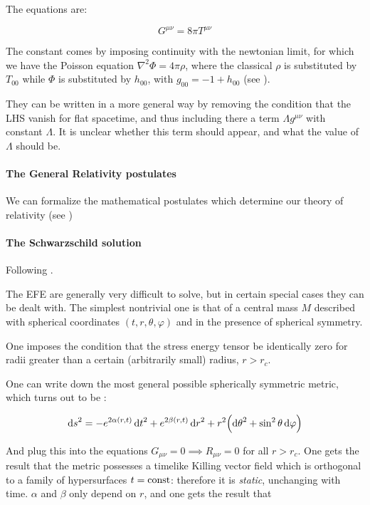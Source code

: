 \documentclass[main.tex]{subfiles}
\begin{document}
The equations are:

\begin{equation}
  G^{\mu\nu} = 8 \pi T^{\mu\nu}
\end{equation}

The constant comes by imposing continuity with the newtonian limit, for which we have the Poisson equation \(\nabla^2 \Phi = 4 \pi \rho\), where the classical \(\rho\) is substituted by \(T_{00}\) while \(\Phi\) is substituted by \(h_{00}\), with \(g_{00} = - 1 + h_{00}\) (see \cite[eq. 4.46]{Carroll:1997ar}).

They can be written in a more general way by removing the condition that the LHS vanish for flat spacetime, and thus including there a term \(\Lambda g^{\mu\nu}\) with constant \(\Lambda\).
It is unclear whether this term should appear, and what the value of \(\Lambda\) should be.

\paragraph{The General Relativity postulates}

We can formalize the mathematical postulates which determine our theory of relativity (see \cite[section 3.2]{})

\paragraph{The Schwarzschild solution}

Following \cite[section 7]{Carroll:1997ar}.

The EFE are generally very difficult to solve, but in certain special cases they can be dealt with. The simplest nontrivial one is that of a central mass \(M\) described with spherical coordinates \((t, r, \theta, \varphi)\) and in the presence of spherical symmetry.

One imposes the condition that the stress energy tensor be identically zero for radii greater than a certain (arbitrarily small) radius, \(r > r_c\).

One can write down the most general possible spherically symmetric metric, which turns out to be \cite[eq. 7.13]{Carroll:1997ar}:

\begin{equation}
  \dd{s} ^2 = -e^{2 \alpha(r, t)} \dd{t}^2 + e^{2 \beta(r, t)} \dd{r}^2
  + r^2 \qty(\dd{\theta}^2 + \sin^2\theta \dd{\varphi})
\end{equation}

And plug this into the equations \(G_{\mu\nu} = 0 \implies R_{\mu\nu} = 0 \) for all \(r>r_c\). One gets the result that the metric possesses a timelike Killing vector field which is orthogonal to a family of hypersurfaces \(t = \operatorname{const}\): therefore it is \emph{static}, unchanging with time.
\(\alpha\) and \(\beta\) only depend on \(r\), and one gets the result that
\end{document}
